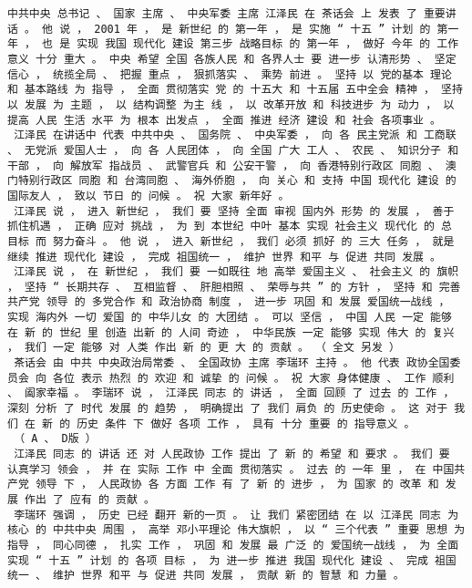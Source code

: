\documentclass{article}
\begin{document}
\begin{Verbatim}[commandchars=\\\{\}]
 中共中央 总书记 、 国家 主席 、 中央军委 主席 江泽民 在 茶话会 上 发表 了 重要讲话 。 他 说 ， 2001 年 ， 是 新世纪 的 第一年 ， 是 实施 “ 十五 ” 计划 的 第一年 ， 也 是 实现 我国 现代化 建设 第三步 战略目标 的 第一年 ， 做好 今年 的 工作 意义 十分 重大 。 中央 希望 全国 各族人民 和 各界人士 要 进一步 认清形势 、 坚定信心 ， 统揽全局 、 把握 重点 ， 狠抓落实 、 乘势 前进 。 坚持 以 党的基本 理论 和 基本路线 为 指导 ， 全面 贯彻落实 党 的 十五大 和 十五届 五中全会 精神 ， 坚持 以 发展 为 主题 ， 以 结构调整 为主 线 ， 以 改革开放 和 科技进步 为 动力 ， 以 提高 人民 生活 水平 为 根本 出发点 ， 全面 推进 经济 建设 和 社会 各项事业 。 
 江泽民 在讲话中 代表 中共中央 、 国务院 、 中央军委 ， 向 各 民主党派 和 工商联 、 无党派 爱国人士 ， 向 各 人民团体 ， 向 全国 广大 工人 、 农民 、 知识分子 和 干部 ， 向 解放军 指战员 、 武警官兵 和 公安干警 ， 向 香港特别行政区 同胞 、 澳门特别行政区 同胞 和 台湾同胞 、 海外侨胞 ， 向 关心 和 支持 中国 现代化 建设 的 国际友人 ， 致以 节日 的 问候 。 祝 大家 新年好 。 
 江泽民 说 ， 进入 新世纪 ， 我们 要 坚持 全面 审视 国内外 形势 的 发展 ， 善于 抓住机遇 ， 正确 应对 挑战 ， 为 到 本世纪 中叶 基本 实现 社会主义 现代化 的 总 目标 而 努力奋斗 。 他 说 ， 进入 新世纪 ， 我们 必须 抓好 的 三大 任务 ， 就是 继续 推进 现代化 建设 ， 完成 祖国统一 ， 维护 世界 和平 与 促进 共同 发展 。 
 江泽民 说 ， 在 新世纪 ， 我们 要 一如既往 地 高举 爱国主义 、 社会主义 的 旗帜 ， 坚持 “ 长期共存 、 互相监督 、 肝胆相照 、 荣辱与共 ” 的 方针 ， 坚持 和 完善 共产党 领导 的 多党合作 和 政治协商 制度 ， 进一步 巩固 和 发展 爱国统一战线 ， 实现 海内外 一切 爱国 的 中华儿女 的 大团结 。 可以 坚信 ， 中国 人民 一定 能够 在 新 的 世纪 里 创造 出新 的 人间 奇迹 ， 中华民族 一定 能够 实现 伟大 的 复兴 ， 我们 一定 能够 对 人类 作出 新 的 更 大 的 贡献 。 （ 全文 另发 ） 
 茶话会 由 中共 中央政治局常委 、 全国政协 主席 李瑞环 主持 。 他 代表 政协全国委员会 向 各位 表示 热烈 的 欢迎 和 诚挚 的 问候 。 祝 大家 身体健康 、 工作 顺利 、 阖家幸福 。 李瑞环 说 ， 江泽民 同志 的 讲话 ， 全面 回顾 了 过去 的 工作 ， 深刻 分析 了 时代 发展 的 趋势 ， 明确提出 了 我们 肩负 的 历史使命 。 这 对于 我们 在 新 的 历史 条件 下 做好 各项 工作 ， 具有 十分 重要 的 指导意义 。 
 （ A 、 D版 ） 
 江泽民 同志 的 讲话 还 对 人民政协 工作 提出 了 新 的 希望 和 要求 。 我们 要 认真学习 领会 ， 并 在 实际 工作 中 全面 贯彻落实 。 过去 的 一年 里 ， 在 中国共产党 领导 下 ， 人民政协 各 方面 工作 有 了 新 的 进步 ， 为 国家 的 改革 和 发展 作出 了 应有 的 贡献 。 
 李瑞环 强调 ， 历史 已经 翻开 新的一页 。 让 我们 紧密团结 在 以 江泽民 同志 为 核心 的 中共中央 周围 ， 高举 邓小平理论 伟大旗帜 ， 以 “ 三个代表 ” 重要 思想 为 指导 ， 同心同德 ， 扎实 工作 ， 巩固 和 发展 最 广泛 的 爱国统一战线 ， 为 全面实现 “ 十五 ” 计划 的 各项 目标 ， 为 进一步 推进 我国 现代化 建设 、 完成 祖国统一 、 维护 世界 和平 与 促进 共同 发展 ， 贡献 新 的 智慧 和 力量 。 

\end{Verbatim}
\end{document}
